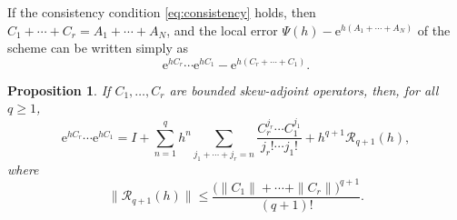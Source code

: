 \documentclass[11pt]{article}
\newtheorem{proposition}[lemma]{Proposition}
\begin{document}
If the consistency condition \eqref{eq:consistency} holds, then 
$C_1 + \cdots + C_r = A_1 + \cdots + A_N$, and the local error $\Psi(h) - \mathrm{e}^{h(A_1 + \cdots + A_N)}$ of the scheme can be written simply as
\begin{equation*}
\mathrm{e}^{h C_r} \cdots \mathrm{e}^{h C_1} - \mathrm{e}^{h (C_r+\cdots+C_1)}.
\end{equation*}


\begin{proposition}
\label{p:boundsB}
If $C_1, \ldots, C_r$ are bounded skew-adjoint operators, then, for all $q \geq 1$,
\begin{equation}
\label{eq:expB2}
\mathrm{e}^{h C_r} \cdots \mathrm{e}^{h C_1} = I + \sum_{n=1}^{q} h^n \sum_{j_1+\cdots+j_r = n} \frac{C_r^{j_r} \cdots C_1^{j_1}}{j_r! \cdots j_1!} + h^{q+1} \mathcal{R}_{q+1}(h),
\end{equation}
where
\begin{equation*}
\|\mathcal{R}_{q+1}(h)\| \leq \frac{\big(\|C_1\| + \cdots + \|C_r\| \big)^{q+1}}{(q+1)!}.
\end{equation*}
\end{proposition}
\end{document}
